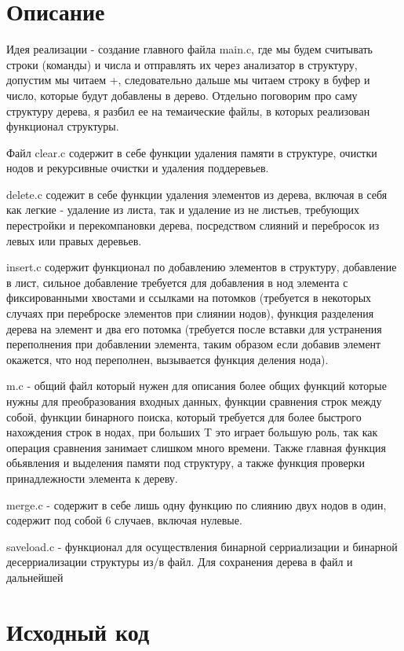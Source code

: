 \section{Описание}

Идея реализации - создание главного файла main.c, где мы будем считывать строки (команды) и числа и отправлять их через анализатор в структуру, допустим мы читаем +, следовательно дальше мы читаем строку в буфер и число, которые будут добавлены в дерево. Отдельно поговорим про саму структуру дерева, я разбил ее на темаические файлы, в которых реализован функционал структуры. 

Файл clear.c содержит в себе функции удаления памяти в структуре, очистки нодов и рекурсивные очистки и удаления поддеревьев. 

delete.c содежит в себе функции удаления элементов из дерева, включая в себя как легкие - удаление из листа, так и удаление из не листьев, требующих перестройки и перекомпановки дерева, посредством слияний и перебросок из левых или правых деревьев.

insert.c содержит функционал по добавлению элементов в структуру, добавление в лист, сильное добавление требуется для добавления в нод элемента с фиксированными хвостами и ссылками на потомков (требуется в некоторых случаях при переброске элементов при слиянии нодов), функция разделения дерева на элемент и два его потомка (требуется после вставки для устранения переполнения при добавлении элемента, таким образом если добавив элемент окажется, что нод переполнен, вызывается функция деления нода).

m.c - общий файл который нужен для описания более общих функций которые нужны для преобразования входных данных, функции сравнения строк между собой, функции бинарного поиска, который требуется для более быстрого нахождения строк в нодах, при больших T это играет большую роль, так как операция сравнения занимает слишком много времени. Также главная функция обьявления и выделения памяти под структуру, а также функция проверки принадлежности элемента к дереву.

merge.c - содержит в себе лишь одну функцию по слиянию двух нодов в один, содержит под собой 6 случаев, включая нулевые.

saveload.c - функционал для осуществления бинарной серриализации и бинарной десерриализации структуры из/в файл. Для сохранения дерева в файл и дальнейшей 



\pagebreak

\section{Исходный код}

